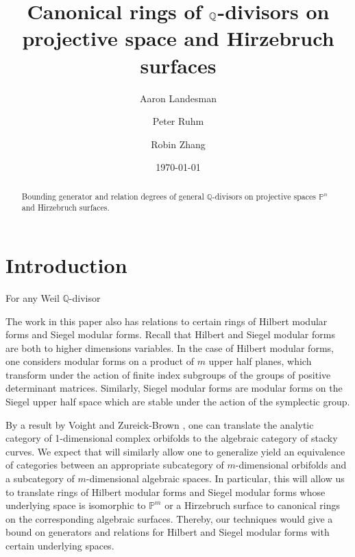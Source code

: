 \documentclass{amsart}
\title{Canonical rings of $\bq$-divisors on projective space and Hirzebruch surfaces}
\author{Aaron Landesman}
\author{Peter Ruhm}
\author{Robin Zhang}
\date{\today}
\theoremstyle{plain}
\theoremstyle{definition}
\theoremstyle{remark}
\numberwithin{equation}{section}
\newcommand\bq{{\mathbb Q}}
\newcommand\bp{{\mathbb P}}
\begin{document}
\begin{abstract}
 	Bounding generator and relation degrees of general $\bq$-divisors
	on projective spaces $\bp^n$ and Hirzebruch surfaces.
\end{abstract}

\maketitle
{}

\section{Introduction}
For any Weil $\bq$-divisor 



The work in this paper also has relations to certain rings of Hilbert 
modular forms and Siegel modular forms. Recall that Hilbert and Siegel 
modular forms are both to higher dimensions variables. In the case of 
Hilbert modular forms, one considers modular forms on a product of $m$
upper half planes, which transform under the action of finite index 
subgroups of the groups of positive determinant matrices. Similarly, Siegel 
modular forms are modular forms on the Siegel upper half space which are 
stable under the action of the symplectic group. 

By a result by Voight and Zureick-Brown \cite[Proposition 6.1.5]{vzb:stacky}, one can translate the analytic category of 1-dimensional complex orbifolds to the algebraic category of stacky curves. 
We expect that  will similarly allow one to generalize yield an equivalence of categories between an appropriate subcategory of $m$-dimensional orbifolds and a subcategory of $m$-dimensional algebraic spaces.
In particular, this will allow us to translate rings of Hilbert modular forms and Siegel modular forms whose underlying space is isomorphic to $\bp^m$ or a Hirzebruch surface to canonical rings on the corresponding algebraic surfaces. Thereby, our techniques would give a bound on generators and relations for Hilbert and Siegel modular forms with certain underlying spaces.
\end{document}
